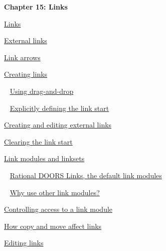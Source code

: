 \documentclass[11pt,a4paper]{article}
\begin{document}
\begin{Large}\textbf{Chapter 15: Links} \end{Large} 
\vspace{1mm}

\href{https://www.ibm.com/support/knowledgecenter/search/Links?scope=SSYQBZ_9.6.1}{Links}

\href{https://www.ibm.com/support/knowledgecenter/search/External%20links?scope=SSYQBZ_9.6.1}{External links}

\href{https://www.ibm.com/support/knowledgecenter/search/Link%20arrows?scope=SSYQBZ_9.6.1}{Link arrows}

\href{https://www.ibm.com/support/knowledgecenter/search/Creating%20links?scope=SSYQBZ_9.6.1}{Creating links}

\,\,\, \href{https://www.ibm.com/support/knowledgecenter/search/Using%20drag-and-drop?scope=SSYQBZ_9.6.1}{Using drag-and-drop}

\,\,\, \href{https://www.ibm.com/support/knowledgecenter/search/Explicitly%20defining%20the%20link%20start?scope=SSYQBZ_9.6.1}{Explicitly defining the link start}

\href{https://www.ibm.com/support/knowledgecenter/search/Creating%20and%20editing%20external%20links?scope=SSYQBZ_9.6.1}{Creating and editing external links}

\href{https://www.ibm.com/support/knowledgecenter/search/Clearing%20the%20link%20start?scope=SSYQBZ_9.6.1}{Clearing the link start}

\href{https://www.ibm.com/support/knowledgecenter/search/Link%20modules%20and%20linksets?scope=SSYQBZ_9.6.1}{Link modules and linksets}

\,\,\, \href{https://www.ibm.com/support/knowledgecenter/search/Rational%20DOORS%20Links,%20the%20default%20link%20modules?scope=SSYQBZ_9.6.1}{Rational DOORS Links, the default link modules}

\,\,\, \href{https://www.ibm.com/support/knowledgecenter/search/Why%20use%20other%20link%20modules??scope=SSYQBZ_9.6.1}{Why use other link modules?}

\href{https://www.ibm.com/support/knowledgecenter/search/Controlling%20access%20to%20a%20link%20module?scope=SSYQBZ_9.6.1}{Controlling access to a link module}

\href{https://www.ibm.com/support/knowledgecenter/search/How%20copy%20and%20move%20affect%20links?scope=SSYQBZ_9.6.1}{How copy and move affect links}

\href{https://www.ibm.com/support/knowledgecenter/search/Editing%20links?scope=SSYQBZ_9.6.1}{Editing links}
\end{document}
